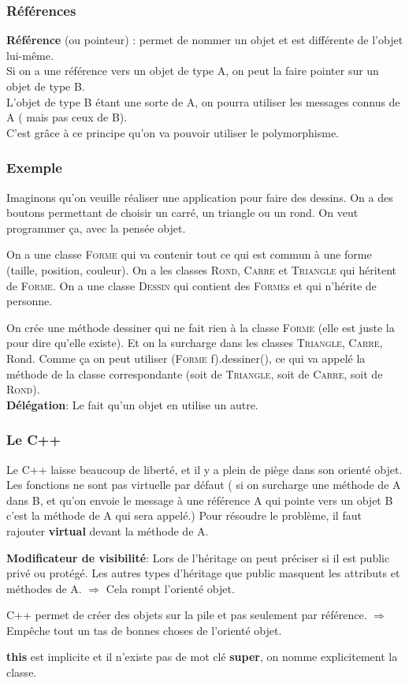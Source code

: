 \subsubsection{Références}
\textbf{Référence} (ou pointeur) : permet de nommer un objet et est différente de l’objet lui-même.
\\Si on a une référence vers un objet de type A, on peut la faire pointer sur un objet de type B.
\\L’objet de type B étant une sorte de A, on pourra utiliser les messages connus de A ( mais pas ceux de B).
\\C’est grâce à ce principe qu’on va pouvoir utiliser le polymorphisme.



\subsubsection{Exemple}
Imaginons qu'on veuille réaliser une application pour faire des dessins. On a des boutons permettant de choisir un carré, un triangle ou un rond. On veut programmer ça, avec la pensée objet.

On a une classe \textsc{Forme} qui va contenir tout ce qui est commun à une forme (taille, position, couleur). On a les classes \textsc{Rond}, \textsc{Carre} et \textsc{Triangle} qui héritent de \textsc{Forme}. On a une classe \textsc{Dessin} qui contient des \textsc{Forme}s et qui n’hérite de personne.

On crée une méthode dessiner qui ne fait rien à la classe \textsc{Forme} (elle est juste la pour dire qu’elle existe). Et on la surcharge dans les classes \textsc{Triangle}, \textsc{Carre}, Rond. Comme ça on peut utiliser (\textsc{Forme} f).dessiner(), ce qui va appelé la méthode de la classe correspondante (soit de \textsc{Triangle}, soit de \textsc{Carre}, soit de \textsc{Rond}).
\\\textbf{Délégation}: Le fait qu’un objet en utilise un autre.



\subsubsection{Le C++}
Le C++ laisse beaucoup de liberté, et il y a plein de piège dans son orienté objet.
Les fonctions ne sont pas virtuelle par défaut ( si on surcharge une méthode de A dans B, et qu’on envoie le message à une référence A qui pointe vers un objet B c’est la méthode de A qui sera appelé.) Pour résoudre le problème, il faut rajouter \textbf{virtual} devant la méthode de A.

\textbf{Modificateur de visibilité}: Lors de l’héritage on peut préciser si il est public privé ou protégé. Les autres types d’héritage que public masquent les attributs et méthodes de A. $\Rightarrow$ Cela rompt l’orienté objet.

C++ permet de créer des objets sur la pile et pas seulement par référence. $\Rightarrow$ Empêche tout un tas de bonnes choses de l’orienté objet.

\textbf{this} est implicite et il n'existe pas de mot clé \textbf{super}, on nomme explicitement la classe.